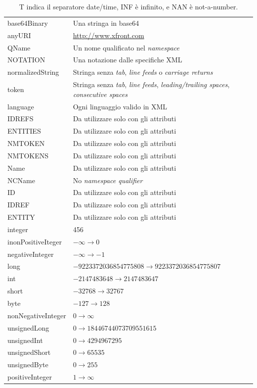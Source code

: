 \documentclass[a4paper]{article}
\begin{document}
\begin{table}[!htp]
\begin{tabular}{@{} l | l @{}}
			\textsf{base64Binary}& Una stringa in base64 \\
			\textsf{anyURI}		& \url{http://www.xfront.com} \\
			\textsf{QName}		& Un nome qualificato nel \emph{namespace} \\
			\textsf{NOTATION}	& Una notazione dalle specifiche XML \\
			\textsf{normalizedString}	& Stringa senza \emph{tab}, \emph{line feeds} o \emph{carriage returns} \\
			\textsf{token}		& Stringa senza \emph{tab}, \emph{line feeds}, \emph{leading/trailing spaces}, \emph{consecutive spaces} \\
			\textsf{language}	& Ogni linguaggio valido in XML \\
			\textsf{IDREFS}		& Da utilizzare solo con gli attributi \\
			\textsf{ENTITIES}	& Da utilizzare solo con gli attributi \\
			\textsf{NMTOKEN}	& Da utilizzare solo con gli attributi \\
			\textsf{NMTOKENS}	& Da utilizzare solo con gli attributi \\
			\textsf{Name}		& Da utilizzare solo con gli attributi \\
			\textsf{NCName}		& No \emph{namespace qualifier} \\
			\textsf{ID}			& Da utilizzare solo con gli attributi \\
			\textsf{IDREF}		& Da utilizzare solo con gli attributi \\
			\textsf{ENTITY}		& Da utilizzare solo con gli attributi \\
			\textsf{integer}	& 456 \\
			\textsf{inonPositiveIteger}	& $-\infty \rightarrow 0$ \\
			\textsf{negativeInteger}	& $-\infty \rightarrow -1$ \\
			\textsf{long}		& $-9223372036854775808 \rightarrow 9223372036854775807$ \\
			\textsf{int}		& $-2147483648 \rightarrow 2147483647$ \\
			\textsf{short}		& $-32768 \rightarrow 32767$ \\
			\textsf{byte}		& $-127 \rightarrow 128$ \\
			\textsf{nonNegativeInteger}	& $0 \rightarrow \infty$ \\
			\textsf{unsignedLong}	& $0 \rightarrow 18446744073709551615$ \\
			\textsf{unsignedInt}	& $0 \rightarrow 4294967295$ \\
			\textsf{unsignedShort}	& $0 \rightarrow 65535$ \\
			\textsf{unsignedByte}	& $0 \rightarrow 255$ \\
			\textsf{positiveInteger}	& $1 \rightarrow \infty$ \\
			\bottomrule
		\end{tabular}
		\caption{T indica il separatore date/time, INF è infinito, e NAN è not-a-number.}
	\end{table}\newpage
	
\end{document}

